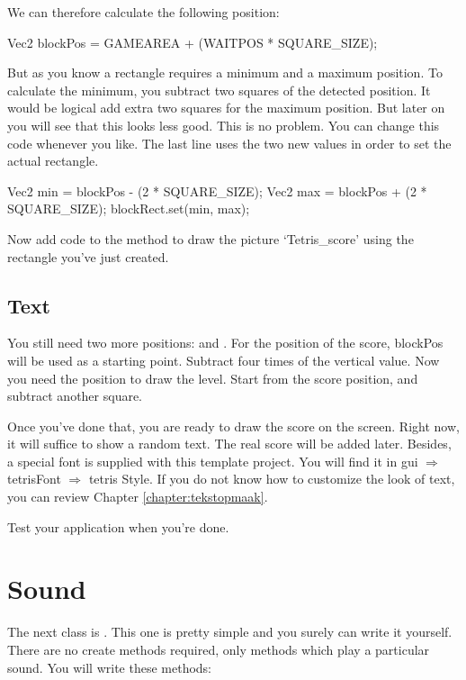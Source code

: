 We can therefore calculate the following position:

\begin{code}
Vec2 blockPos = GAMEAREA + (WAITPOS * SQUARE_SIZE);
\end{code}

But as you know a rectangle requires a minimum and a maximum position. To calculate the minimum, you subtract two squares of the detected position. It would be logical add extra two squares for the maximum position. But later on you will see that this looks less good. This is no problem. You can change this code whenever you like. The last line uses the two new values ​​in order to set the actual rectangle.

\begin{code}
Vec2 min = blockPos - (2 * SQUARE_SIZE);
Vec2 max = blockPos + (2 * SQUARE_SIZE);
blockRect.set(min, max);
\end{code}

Now add code to the  method to draw the picture `Tetris\_score' using the rectangle you've just created.

\subsection{Text}
You still need two more positions:  and . For the position of the score, blockPos will be used as a starting point. Subtract  four times of the vertical value. Now you need the position to draw the level. Start from the score position, and subtract another square.

Once you've done that, you are ready to draw the score on the screen. Right now, it will suffice to show a random text. The real score will be added later. Besides, a special font is supplied with this template project. You will find it in gui $\Rightarrow$ tetrisFont $\Rightarrow$ tetris Style. If you do not know how to customize the look of text, you can review Chapter \ref{chapter:tekstopmaak}.

Test your application when you're done.

\section{Sound}
The next class is . This one is pretty simple and you surely can write it yourself. There are no create methods required, only methods which play a particular sound. You will write these methods:

